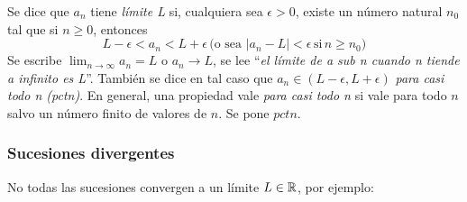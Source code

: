 \documentclass[../teoria.root.tex]{subfiles}
\begin{document}
Se dice que \(a_n\) tiene \textit{límite L} si, cualquiera sea \(\epsilon>0\), existe un número natural \(n_0\) tal que si \(n\geq0\), entonces \[L-\epsilon<a_n<L+\epsilon\,\text{(o sea \(|a_n-L|<\epsilon\,\text{si}\,n\geq n_0\))}\]
Se escribe \(\lim_{n\to\infty}a_n=L\) o \(a_n\rightarrow L\), se lee ``\textit{el límite de a sub n cuando n tiende a infinito es L}''.
También se dice en tal caso que \(a_n\in(L-\epsilon,L+\epsilon)\) \textit{para casi todo n (pctn)}.
En general, una propiedad vale \textit{para casi todo n} si vale para todo \(n\) salvo un número finito de valores de \(n\).
Se pone \(pctn\).
\subsubsection{Sucesiones divergentes}
No todas las sucesiones convergen a un límite \(L\in\mathbb{R}\), por ejemplo:
\end{document}
